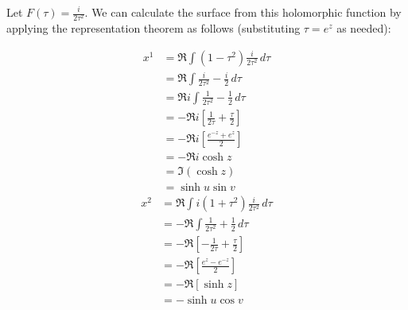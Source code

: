   \newcommand{\tauint}[2]{\Re#1\int\!#2\,d\tau}
  \begin{ex}
    \label{ex:helicoid}
    Let $F(\tau) = \frac{i}{2\tau^2}$. We can calculate the surface from this holomorphic function by applying the representation theorem as follows (substituting $\tau = e^z$ as needed):

    \begin{multicols}{2}
      \begin{align*}
        x^1 &= \tauint{}{(1 - \tau^2)\frac{i}{2\tau^2}}\\
        &= \tauint{}{\frac{i}{2\tau^2} - \frac{i}{2}}\\
        &= \tauint{i}{\frac{1}{2\tau^2} - \frac{1}{2}}\\
        &= -\Re i\left[\frac{1}{2\tau} + \frac{\tau}{2}\right]\\
        &= -\Re i\left[\frac{e^{-z} + e^z}{2}\right]\\
        &= -\Re i \cosh z\\
        &= \Im(\cosh z)\\
        &= \sinh u \sin v
      \end{align*}\break
      \begin{align*}
        x^2 &= \tauint{}{i(1 + \tau^2)\frac{i}{2\tau^2}}\\
        &= -\tauint{}{\frac{1}{2\tau^2} + \frac{1}{2}}\\
        &= -\Re\left[-\frac{1}{2\tau} + \frac{\tau}{2}\right]\\
        &= -\Re\left[\frac{e^z - e^{-z}}{2}\right]\\
        &= -\Re[\sinh z]\\
        &= -\sinh u \cos v
      \end{align*}
    \end{multicols}
    

\end{ex}
